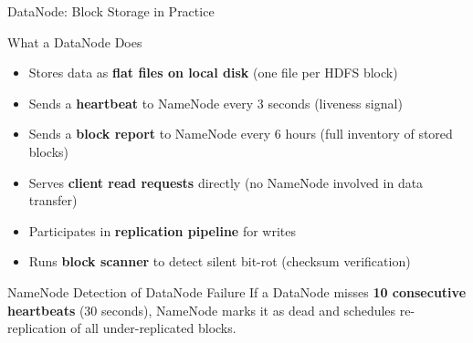 \documentclass[aspectratio=169,10pt]{beamer}
\begin{document}
\begin{frame}{DataNode: Block Storage in Practice}
 
      \begin{block}{What a DataNode Does}
        \begin{itemize}
          \item Stores data as \textbf{flat files on local disk} (one file per HDFS block)
          \item Sends a \textbf{heartbeat} to NameNode every 3 seconds (liveness signal)
          \item Sends a \textbf{block report} to NameNode every 6 hours (full inventory of stored blocks)
          \item Serves \textbf{client read requests} directly (no NameNode involved in data transfer)
          \item Participates in \textbf{replication pipeline} for writes
          \item Runs \textbf{block scanner} to detect silent bit-rot (checksum verification)
        \end{itemize}
      \end{block}
      \vspace{4pt}
      \begin{alertblock}{NameNode Detection of DataNode Failure}
        If a DataNode misses \textbf{10 consecutive heartbeats} (30 seconds), NameNode marks it as dead and schedules re-replication of all under-replicated blocks.
      \end{alertblock}
 
\end{frame}
\end{document}
